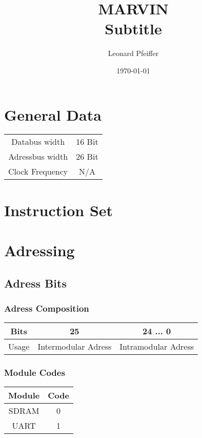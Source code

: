 \documentclass[11pt]{article}
\title{
	\huge MARVIN \\
	\vspace{7pt}
	\Large Subtitle
}
\author{Leonard Pfeiffer}
\date{\today}
\begin{document}
	\maketitle \label{title}
	\newpage
	
	\tableofcontents \label{toc}
	\newpage

    \section{General Data}
        \begin{center}
            \begin{tabular}{c | c}
                Databus width & 16 Bit \\
                Adressbus width & 26 Bit \\
                Clock Frequency & N/A \\
            \end{tabular}
        \end{center}

    \section{Instruction Set} \label{instructionSet}

    \section{Adressing}
        \subsection{Adress Bits}
            \subsubsection{Adress Composition}
                \begin{center}
                    \begin{tabular}{c | c | c}
                        Bits & 25 & 24 ... 0 \\ \hline
                        Usage & Intermodular Adress & Intramodular Adress
                    \end{tabular}
                \end{center}

            \subsubsection{Module Codes}
                \begin{center}
                    \begin{tabular}{c | c}
                        Module & Code \\ \hline
                        SDRAM & 0 \\
                        UART & 1 \\
                    \end{tabular}
                \end{center}
\end{document}
